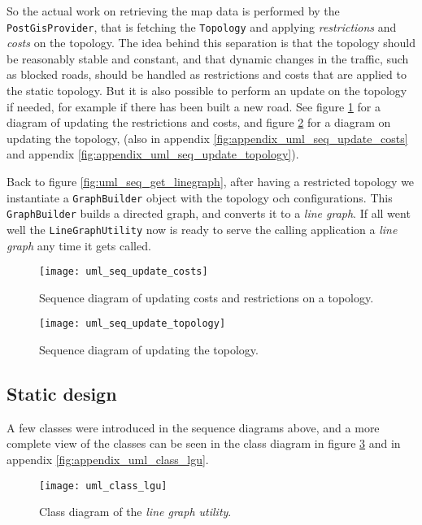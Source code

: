 \documentclass[../main.tex]{subfiles}
\begin{document}
So the actual work on retrieving the map data is performed by the \texttt{PostGisProvider}, that is fetching the \texttt{Topology} and applying \textit{restrictions} and \textit{costs} on the topology. The idea behind this separation is that the topology should be reasonably stable and constant, and that dynamic changes in the traffic, such as blocked roads, should be handled as restrictions and costs that are applied to the static topology. But it is also possible to perform an update on the topology if needed, for example if there has been built a new road.
See figure \ref{fig:uml_seq_update_costs} for a diagram of updating the restrictions and costs, and figure \ref{fig:uml_seq_update_topology} for a diagram on updating the topology, (also in appendix \ref{fig:appendix_uml_seq_update_costs} and appendix \ref{fig:appendix_uml_seq_update_topology}).

Back to figure \ref{fig:uml_seq_get_linegraph}, after having a restricted topology we instantiate a \texttt{GraphBuilder} object with the topology och configurations. This \texttt{GraphBuilder} builds a directed graph, and converts it to a \textit{line graph}. If all went well the \texttt{LineGraphUtility} now is ready to serve the calling application a \textit{line graph} any time it gets called.

\begin{figure}[H]
    \centering
    \texttt{[image: uml\_seq\_update\_costs]}
    \caption{Sequence diagram of updating costs and restrictions on a topology.}
    \label{fig:uml_seq_update_costs}
\end{figure}
\begin{figure}[H]
    \centering
    \texttt{[image: uml\_seq\_update\_topology]}
    \caption{Sequence diagram of updating the topology.}
    \label{fig:uml_seq_update_topology}
\end{figure}

\subsection{Static design}
A few classes were introduced in the sequence diagrams above, and a more complete view of the classes can be seen in the class diagram in figure \ref{fig:uml_class_lgu} and in appendix \ref{fig:appendix_uml_class_lgu}.


\begin{figure}[h]
    \centering
    \texttt{[image: uml\_class\_lgu]}
    \caption{Class diagram of the \textit{line graph utility}.}
    \label{fig:uml_class_lgu}
\end{figure}
\end{document}
